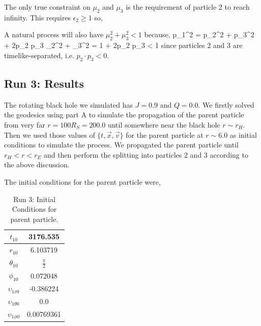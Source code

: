 The only true constraint on $\mu_2$ and $\mu_3$ is the requirement of particle 2 to reach infinity. This requires $\epsilon_2\ge1$ so,
\be
\ee

A natural process will also have $\mu_2^2 + \mu_3^2 < 1$ because,
\be
	p_1^2 = p_2^2 + p_3^2 + 2p_2 \cdot p_3 \Rightarrow \mu_2^2 + \mu_3^2 = 1 + 2p_2 \cdot p_3 < 1
\ee
since particles 2 and 3 are timelike-separated, i.e. $p_2 \cdot p_3 < 0$.

\subsection{Run 3: Results}
The rotating black hole we simulated has $J=0.9$ and $Q=0.0$. We firstly solved the geodesics using part A to simulate the propagation of the parent particle from very far $r = 100R_{S} = 200.0$ until somewhere near the black hole $r \sim r_{H} $. Then we used those values of $\{t,\vec{x},\vec{v}\}$ for the parent particle at $r\sim6.0$ as initial conditions to simulate the process. We propagated the parent particle until $r_{H} < r < r_{E}$ and then perform the splitting into particles 2 and 3 according to the above discussion.

The initial conditions for the parent particle were,
\begin{table}[H]
	\centering
	\begin{tabular}{|c|c|}
		\hline
		$t_{10}$ & 3176.535 \\
		\hline
		$r_{10}$ & 6.103719 \\
		\hline
		$\theta_{10}$ & $\frac{\pi}{2}$ \\
		\hline
		$\phi_{10}$ & 0.072048 \\
		\hline
		\hline
		$\upsilon_{1r0}$ & -0.386224 \\
		\hline
		$\upsilon_{1\theta0}$ & 0.0 \\
		\hline
		$\upsilon_{1\phi0}$ & 0.00769361 \\
		\hline
	\end{tabular}
	\caption[Run 3: Initial Conditions for parent particle]{Run 3: Initial Conditions for parent particle.}
	\label{tbl:RUN3_IC}
\end{table}

